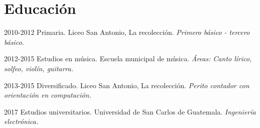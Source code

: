 \documentclass[]{twentysecondcv}
\begin{document}
\section{Educaci\'on}

\begin{twenty}
  
  \twentyitem 
    {2010-2012}
    {{\normalfont Primaria.}}    
    {Liceo San Antonio, La recolecci\'on.}
    {\emph{Primero b\'asico - tercero b\'asico.}}
    
  \twentyitem 
    {2012-2015}
    {{\normalfont Estudios en m\'usica.}}
    {Escuela municipal de m\'usica.}
    {\emph{\'Areas: Canto l\'irico, solfeo, viol\'in, guitarra.}}  
    
  \twentyitem
    {2013-2015}
    {{\normalfont Diversificado.}}
    {Liceo San Antonio, La recolecci\'on.}
    {\emph{Perito contador con orientaci\'on en computaci\'on.}}

  \twentyitem
    {2017}
    {Estudios universitarios.}
    {Universidad de San Carlos de Guatemala.}
    {\emph{Ingenier\'ia electr\'onica.}}
    
\end{twenty}



\end{document}
